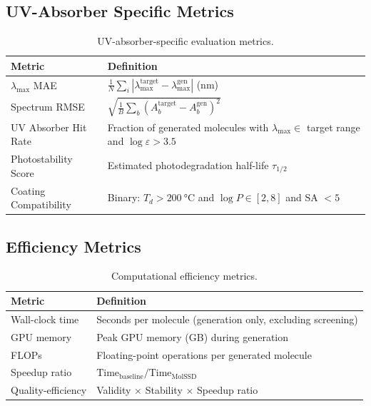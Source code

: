 \documentclass[12pt,a4paper]{article}
\begin{document}
\subsection{UV-Absorber Specific Metrics}

\begin{table}[H]
\centering
\caption{UV-absorber-specific evaluation metrics.}
\label{tab:metrics_uv}
\begin{tabular}{p{3.5cm}p{9cm}}
\toprule
\textbf{Metric} & \textbf{Definition} \\
\midrule
$\lambda_{\max}$ MAE & $\frac{1}{N} \sum_i |\lambda_{\max}^{\text{target}} - \lambda_{\max}^{\text{gen}}|$ (nm) \\
\midrule
Spectrum RMSE & $\sqrt{\frac{1}{B} \sum_b (A_b^{\text{target}} - A_b^{\text{gen}})^2}$ \\
\midrule
UV Absorber Hit Rate & Fraction of generated molecules with $\lambda_{\max} \in$ target range and $\log\varepsilon > 3.5$ \\
\midrule
Photostability Score & Estimated photodegradation half-life $\tau_{1/2}$ \\
\midrule
Coating Compatibility & Binary: $T_d > \SI{200}{\celsius}$ and $\log P \in [2, 8]$ and SA $< 5$ \\
\bottomrule
\end{tabular}
\end{table}

\subsection{Efficiency Metrics}

\begin{table}[H]
\centering
\caption{Computational efficiency metrics.}
\label{tab:metrics_efficiency}
\begin{tabular}{p{3.5cm}p{9cm}}
\toprule
\textbf{Metric} & \textbf{Definition} \\
\midrule
Wall-clock time & Seconds per molecule (generation only, excluding screening) \\
\midrule
GPU memory & Peak GPU memory (GB) during generation \\
\midrule
FLOPs & Floating-point operations per generated molecule \\
\midrule
Speedup ratio & $\text{Time}_{\text{baseline}} / \text{Time}_{\text{MolSSD}}$ \\
\midrule
Quality-efficiency & Validity $\times$ Stability $\times$ Speedup ratio \\
\bottomrule
\end{tabular}
\end{table}
\end{document}
